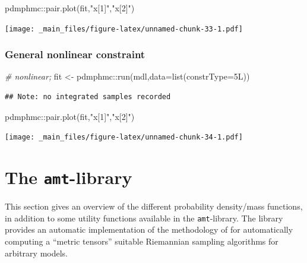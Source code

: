 \documentclass[
]{book}
\newenvironment{Shaded}{\begin{snugshade}}{\end{snugshade}}
\newcommand{\AttributeTok}[1]{\textcolor[rgb]{0.77,0.63,0.00}{#1}}
\newcommand{\CommentTok}[1]{\textcolor[rgb]{0.56,0.35,0.01}{\textit{#1}}}
\newcommand{\FunctionTok}[1]{\textcolor[rgb]{0.00,0.00,0.00}{#1}}
\newcommand{\NormalTok}[1]{#1}
\newcommand{\OtherTok}[1]{\textcolor[rgb]{0.56,0.35,0.01}{#1}}
\newcommand{\SpecialCharTok}[1]{\textcolor[rgb]{0.00,0.00,0.00}{#1}}
\newcommand{\StringTok}[1]{\textcolor[rgb]{0.31,0.60,0.02}{#1}}
\begin{document}
\begin{Shaded}
\begin{Highlighting}[]
\NormalTok{pdmphmc}\SpecialCharTok{::}\FunctionTok{pair.plot}\NormalTok{(fit,}\StringTok{"x[1]"}\NormalTok{,}\StringTok{"x[2]"}\NormalTok{)}
\end{Highlighting}
\end{Shaded}

\texttt{[image: \_main\_files/figure-latex/unnamed-chunk-33-1.pdf]}

\hypertarget{general-nonlinear-constraint}{%
\subsection{General nonlinear constraint}\label{general-nonlinear-constraint}}

\begin{Shaded}
\begin{Highlighting}[]
\CommentTok{\# nonlinear;}
\NormalTok{fit }\OtherTok{\textless{}{-}}\NormalTok{ pdmphmc}\SpecialCharTok{::}\FunctionTok{run}\NormalTok{(mdl,}\AttributeTok{data=}\FunctionTok{list}\NormalTok{(}\AttributeTok{constrType=}\NormalTok{5L))}
\end{Highlighting}
\end{Shaded}

\begin{verbatim}
## Note: no integrated samples recorded
\end{verbatim}

\begin{Shaded}
\begin{Highlighting}[]
\NormalTok{pdmphmc}\SpecialCharTok{::}\FunctionTok{pair.plot}\NormalTok{(fit,}\StringTok{"x[1]"}\NormalTok{,}\StringTok{"x[2]"}\NormalTok{)}
\end{Highlighting}
\end{Shaded}

\texttt{[image: \_main\_files/figure-latex/unnamed-chunk-34-1.pdf]}

\hypertarget{amt-lib}{%
\chapter{\texorpdfstring{The \texttt{amt}-library}{The amt-library}}\label{amt-lib}}

This section gives an overview of the different probability density/mass functions, in addition to some utility functions available in the \texttt{amt}-library. The library provides an automatic
implementation of the methodology of \citet{kleppe_amt} for automatically computing a ``metric tensors'' suitable Riemannian sampling algorithms for arbitrary models.
\end{document}
